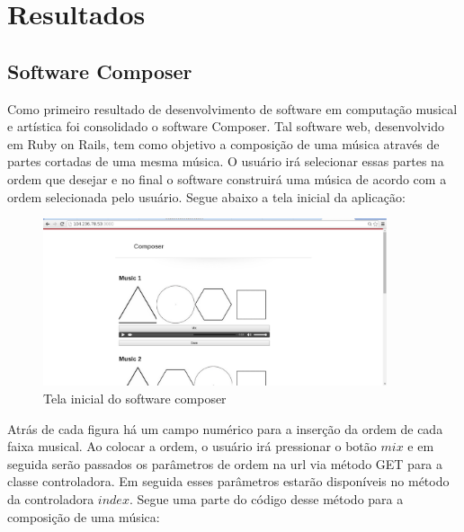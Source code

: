 \chapter{Resultados}

\section{Software Composer}
Como primeiro resultado de desenvolvimento de software em computação musical e artística foi consolidado o software Composer. Tal software web, desenvolvido em Ruby on Rails, tem como objetivo a composição de uma música através de partes cortadas de uma mesma música. O usuário irá selecionar essas partes na ordem que desejar e no final o software construirá uma música de acordo com a ordem selecionada pelo usuário. Segue abaixo a tela inicial da aplicação:

\begin{figure}[h!]
        \centering
        \includegraphics[width=0.9\textwidth]{figuras/composer_1.eps}
        \caption{Tela inicial do software composer}
        \label{fig:cronograma}
\end{figure}

Atrás de cada figura há um campo numérico para a inserção da ordem de cada faixa musical. Ao colocar a ordem, o usuário irá pressionar o botão $mix$ e em seguida serão passados os parâmetros de ordem na url via método GET para a classe controladora. Em seguida esses parâmetros estarão disponíveis no método da controladora $index$. Segue uma parte do código desse método para a composição de uma música:

